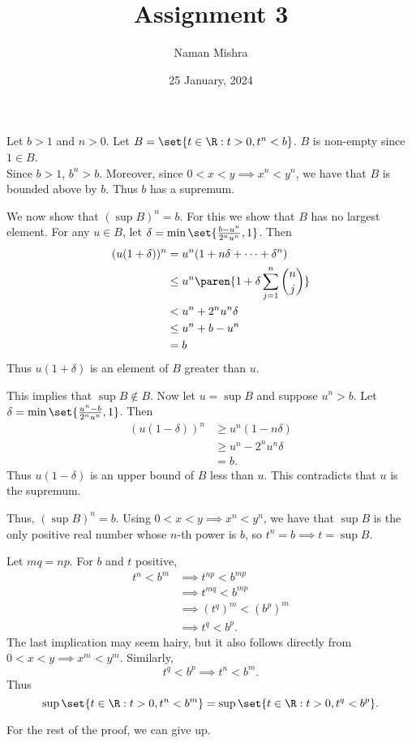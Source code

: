 \documentclass[12pt]{article}
\title      {Assignment 3}
\author{Naman Mishra}
\date{25 January, 2024}
\begin{document}
\maketitle
\begin{problem*}
\end{problem*}

\begin{solution}[Case 1]
    Let $b > 1$ and $n > 0$.
    Let $B = \set{t \in \R : t > 0, t^n < b}$.
    $B$ is non-empty since $1 \in B$.
    \\
    Since $b > 1$, $b^n > b$.
    Moreover, since $0 < x < y \implies x^n < y^n$,
    we have that $B$ is bounded above by $b$.
    Thus $b$ has a supremum.

    We now show that $(\sup B)^n = b$.
    For this we show that $B$ has no largest element.
    For any $u \in B$, let $\delta = \min\set{\frac{b - u^n}{2^n u^n}, 1}$.
    Then \begin{align*}
    (u(1 + \delta))^n
        &= u^n (1 + n \delta + \dots + \delta^n) \\
        &\le u^n \paren{1 + \delta \sum_{j=1}^{n} \binom{n}{j}} \\
        &< u^n + 2^n u^n \delta \\
        &\le u^n + b - u^n \\
        &= b
    \end{align*}
    Thus $u(1 + \delta)$ is an element of $B$ greater than $u$.

    This implies that $\sup B \notin B$.
    Now let $u = \sup B$ and suppose $u^n > b$.
    Let $\delta = \min\set{\frac{u^n - b}{2^n u^n}, 1}$.
    Then \begin{align*}
    (u(1 - \delta))^n
        &\ge u^n (1 - n \delta) \\
        &\ge u^n - 2^n u^n \delta \\
        &= b.
    \end{align*}
    Thus $u(1 - \delta)$ is an upper bound of $B$ less than $u$.
    This contradicts that $u$ is the supremum.

    Thus, $(\sup B)^n = b$.
    Using $0 < x < y \implies x^n < y^n$, we have that $\sup B$ is the
    only positive real number whose $n$-th power is $b$,
    so $t^n = b \implies t = \sup B$.
\end{solution}
\begin{solution}[Case 2]
    Let $mq = np$.
    For $b$ and $t$ positive,
    \begin{align*}
        t^n < b^m
            &\implies t^{np} < b^{mp} \\
            &\implies t^{mq} < b^{mp} \\
            &\implies (t^q)^m < (b^p)^m \\
            &\implies t^q < b^p.
    \end{align*}
    The last implication may seem hairy, but it also follows directly from
    $0 < x < y \implies x^m < y^m$.
    Similarly, \[
        t^q < b^p \implies t^n < b^m.
    \] Thus \[
        \sup\set{t \in \R : t > 0, t^n < b^m}
            = \sup\set{t \in \R : t > 0, t^q < b^p}.
    \]

    For the rest of the proof, we can give up.
\end{solution}
\end{document}
